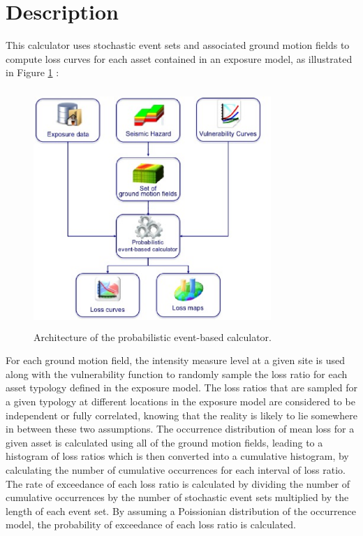 \section{Description}
This calculator uses stochastic event sets and associated ground motion fields to compute loss curves for each asset contained in an exposure model, as illustrated in Figure \ref{fig:Scheme_Prob_calc} :  

\begin{figure}[ht]
\centering
\includegraphics[width=9cm,height=9cm]{./Figures/Part_Risk/Scheme_Prob_calc.eps}
\caption{Architecture of the probabilistic event-based calculator.}
\label{fig:Scheme_Prob_calc}
\end{figure}

For each ground motion field, the intensity measure level at a given site is used along with the vulnerability function to randomly sample the loss ratio for each asset typology defined in the exposure model. The loss ratios that are sampled for a given typology at different locations in the exposure model are considered to be independent or fully correlated, knowing that the reality is likely to lie somewhere in between these two assumptions. The occurrence distribution of mean loss for a given asset is calculated using all of the ground motion fields, leading to a histogram of loss ratios which is then converted into a cumulative histogram, by calculating the number of cumulative occurrences for each interval of loss ratio. The rate of exceedance of each loss ratio is calculated by dividing the number of cumulative occurrences by the number of stochastic event sets multiplied by the length of each event set. By assuming a Poissionian distribution of the occurrence model, the probability of exceedance of each loss ratio is calculated. 
 
